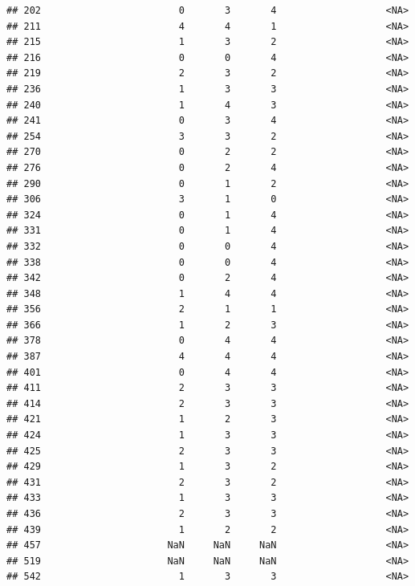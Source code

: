 \documentclass[
]{article}
\begin{document}
\begin{verbatim}
## 202                        0       3       4                   <NA>
## 211                        4       4       1                   <NA>
## 215                        1       3       2                   <NA>
## 216                        0       0       4                   <NA>
## 219                        2       3       2                   <NA>
## 236                        1       3       3                   <NA>
## 240                        1       4       3                   <NA>
## 241                        0       3       4                   <NA>
## 254                        3       3       2                   <NA>
## 270                        0       2       2                   <NA>
## 276                        0       2       4                   <NA>
## 290                        0       1       2                   <NA>
## 306                        3       1       0                   <NA>
## 324                        0       1       4                   <NA>
## 331                        0       1       4                   <NA>
## 332                        0       0       4                   <NA>
## 338                        0       0       4                   <NA>
## 342                        0       2       4                   <NA>
## 348                        1       4       4                   <NA>
## 356                        2       1       1                   <NA>
## 366                        1       2       3                   <NA>
## 378                        0       4       4                   <NA>
## 387                        4       4       4                   <NA>
## 401                        0       4       4                   <NA>
## 411                        2       3       3                   <NA>
## 414                        2       3       3                   <NA>
## 421                        1       2       3                   <NA>
## 424                        1       3       3                   <NA>
## 425                        2       3       3                   <NA>
## 429                        1       3       2                   <NA>
## 431                        2       3       2                   <NA>
## 433                        1       3       3                   <NA>
## 436                        2       3       3                   <NA>
## 439                        1       2       2                   <NA>
## 457                      NaN     NaN     NaN                   <NA>
## 519                      NaN     NaN     NaN                   <NA>
## 542                        1       3       3                   <NA>

\end{verbatim}
\end{document}
